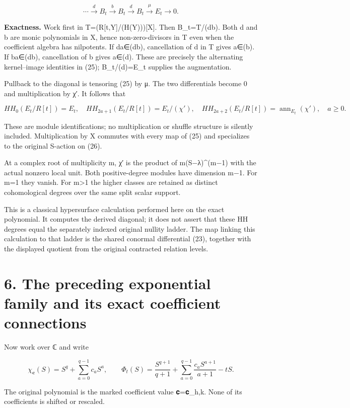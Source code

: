 \documentclass[
  11pt,
]{article}
\begin{document}
\[
\cdots\xrightarrow{d}B_t\xrightarrow{b}B_t
\xrightarrow{d}B_t\xrightarrow{\mu}E_t\longrightarrow0.
\tag{25}
\]

\textbf{Exactness.} Work first in T=(R{[}t,Y{]}/(H(Y))){[}X{]}. Then
B\_t=T/(db). Both d and b are monic polynomials in X, hence
non-zero-divisors in T even when the coefficient algebra has nilpotents.
If da∈(db), cancellation of d in T gives a∈(b). If ba∈(db), cancellation
of b gives a∈(d). These are precisely the alternating kernel--image
identities in (25); B\_t/(d)=E\_t supplies the augmentation.

Pullback to the diagonal is tensoring (25) by μ. The two differentials
become 0 and multiplication by χ′. It follows that

\[
HH_0(E_t/R[t])=E_t,
\quad HH_{2a+1}(E_t/R[t])=E_t/(\chi'),
\quad HH_{2a+2}(E_t/R[t])=\operatorname{ann}_{E_t}(\chi'),
\quad a\ge0.
\tag{26}
\]

These are module identifications; no multiplication or shuffle structure
is silently included. Multiplication by X commutes with every map of
(25) and specializes to the original S-action on (26).

At a complex root of multiplicity m, χ′ is the product of
m(S−λ)\^{}(m−1) with the actual nonzero local unit. Both positive-degree
modules have dimension m−1. For m=1 they vanish. For m\textgreater1 the
higher classes are retained as distinct cohomological degrees over the
same split scalar support.

This is a classical hypersurface calculation performed here on the exact
polynomial. It computes the derived diagonal; it does not assert that
these HH degrees equal the separately indexed original nullity ladder.
The map linking this calculation to that ladder is the shared conormal
differential (23), together with the displayed quotient from the
original contracted relation levels.

\section{6. The preceding exponential family and its exact coefficient
connections}\label{the-preceding-exponential-family-and-its-exact-coefficient-connections}

Now work over ℂ and write

\[
\chi_{\mathbf c}(S)=S^q+\sum_{a=0}^{q-1}c_aS^a,
\qquad
\Phi_t(S)=\frac{S^{q+1}}{q+1}
 +\sum_{a=0}^{q-1}\frac{c_aS^{a+1}}{a+1}-tS.
\tag{27}
\]

The original polynomial is the marked coefficient value 𝐜=𝐜\_h,k. None
of its coefficients is shifted or rescaled.
\end{document}
